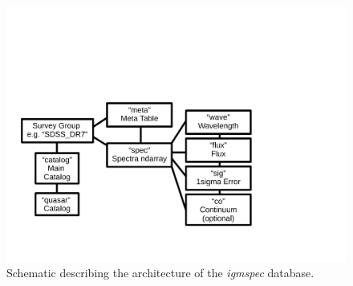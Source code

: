 \documentclass[12pt]{elsarticle}
\begin{document}





%
%


\begin{figure}
\includegraphics[width=6in]{architecture_v02.pdf}
\caption{Schematic describing the architecture of 
the {\it igmspec} database.
}
\label{fig:arch}
\end{figure}
\end{document}
